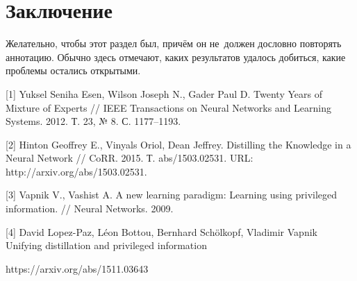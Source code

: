 \documentclass[12pt,twoside]{article}
\begin{document}
\section{Заключение}
Желательно, чтобы этот раздел был, причём он не~должен дословно повторять аннотацию.
Обычно здесь отмечают,
каких результатов удалось добиться,
какие проблемы остались открытыми.

[1] Yuksel Seniha Esen, Wilson Joseph N., Gader Paul D. Twenty Years of Mixture
of Experts // IEEE Transactions on Neural Networks and Learning Systems. 2012.
Т. 23, № 8. С. 1177–1193.

[2] Hinton Geoffrey E., Vinyals Oriol, Dean Jeffrey. Distilling the Knowledge
in a Neural Network // CoRR. 2015. Т. abs/1503.02531. URL:
http://arxiv.org/abs/1503.02531.


[3]  Vapnik V., Vashist A. A new learning paradigm: Learning using privileged
information. // Neural Networks. 2009.

[4] David Lopez-Paz, Léon Bottou, Bernhard Schölkopf, Vladimir Vapnik
 Unifying distillation and privileged information

https://arxiv.org/abs/1511.03643





\end{document}
